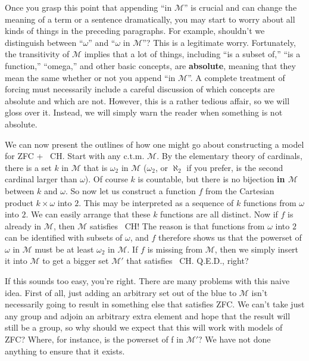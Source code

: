 \documentclass[10pt]{article}
\newcommand\axiom[1]{\textmd{#1}}
\theoremstyle{definition}
\begin{document}
Once you grasp this point that appending ``in $\mathcal M$'' is crucial and can change the meaning of a term or a sentence dramatically, you may start to worry about all kinds of things in the preceding paragraphs. For example, shouldn't we distinguish between ``$\omega$'' and ``$\omega$ in $\mathcal M$''? This is a legitimate worry. Fortunately, the transitivity of $\mathcal{M}$ implies that a lot of things, including ``is a subset of,'' ``is a function,'' ``omega,'' and other basic concepts, are \textbf{absolute}, meaning that they mean the same whether or not you append ``in $\mathcal M$''. A complete treatment of forcing must necessarily include a careful discussion of which concepts are absolute and which are not. However, this is a rather tedious affair, so we will gloss over it. Instead, we will simply warn the reader when something is not absolute.

We can now present the outlines of how one might go about constructing a model for \axiom{ZFC} + \axiom{~CH}. Start with any c.t.m. $\mathcal M$. By the elementary theory of cardinals, there is a set $k$ in $\mathcal{M}$ that is $\omega_2$ in $\mathcal{M}$ ($\omega_2$, or $\aleph_2$ if you prefer, is the second cardinal larger than $\omega$). Of course $k$ is countable, but there is no bijection \textbf{in $\mathcal M$} between $k$ and $\omega$. So now let us construct a function $f$ from the Cartesian product $k \times \omega$ into $2$. This may be interpreted as a sequence of $k$ functions from $\omega$ into $2$. We can easily arrange that these $k$ functions are all distinct. Now if $f$ is already in $\mathcal M$, then $\mathcal{M}$ satisfies \axiom{~CH}! The reason is that functions from $\omega$ into $2$ can be identified with subsets of $\omega$, and $f$ therefore shows us that the powerset of $\omega$ in $\mathcal{M}$ must be at least $\omega_2$ in $\mathcal M$. If $f$ is missing from $\mathcal M$, then we simply insert it into $\mathcal{M}$ to get a bigger set $\mathcal{M'}$ that satisfies \axiom{~CH}. Q.E.D., right?

If this sounds too easy, you're right. There are many problems with this naive idea. First of all, just adding an arbitrary set out of the blue to $\mathcal M$ isn't necessarily going to result in something else that satisfies \axiom{ZFC}. We can't take just any group and adjoin an arbitrary extra element and hope that the result will still be a group, so why should we expect that this will work with models of \axiom{ZFC}? Where, for instance, is the powerset of f in $\mathcal{M'}$? We have not done anything to ensure that it exists.
\end{document}
